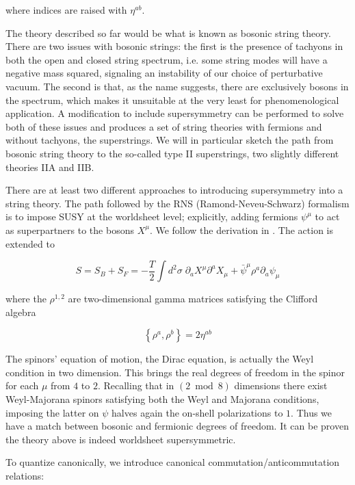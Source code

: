 where indices are raised with $\eta^{ab}$.

The theory described so far would be what is known as bosonic string theory. There are two issues with bosonic strings: the first is the presence of tachyons in both the open and closed string spectrum, i.e. some string modes will have a negative mass squared, signaling an instability of our choice of perturbative vacuum. The second is that, as the name suggests, there are exclusively bosons in the spectrum, which makes it unsuitable at the very least for phenomenological application. A modification to include supersymmetry can be performed to solve both of these issues and produces a set of string theories with fermions and without tachyons, the superstrings. We will in particular sketch the path from bosonic string theory to the so-called type II superstrings, two slightly different theories IIA and IIB.

There are at least two different approaches to introducing supersymmetry into a string theory. The path followed by the RNS (Ramond-Neveu-Schwarz) formalism is to impose SUSY at the worldsheet level; explicitly, adding fermions $\psi^\mu$ to act as superpartners to the bosons $X^\mu$. We follow the derivation in \cite{BBS}. The action is extended to

\begin{equation}
S = S_B + S_F = -\frac{T}{2} \int d^2\sigma \; \partial_a X^\mu \partial^a X_\mu + \bar \psi^\mu \rho^a \partial_a \psi_\mu
\end{equation}

where the $\rho^{1,2}$ are two-dimensional gamma matrices satisfying the Clifford algebra

\begin{equation}
	\left\{ \rho^a,\rho^b \right\} = 2\eta^{ab}
	\label{}
\end{equation}

The spinors' equation of motion, the Dirac equation, is actually the Weyl condition in two dimension. This brings the real degrees of freedom in the spinor for each $\mu$ from $4$ to $2$. Recalling that in $(2\bmod 8)$ dimensions there exist Weyl-Majorana spinors satisfying both the Weyl and Majorana conditions, imposing the latter on $\psi$ halves again the on-shell polarizations to $1$. Thus we have a match between bosonic and fermionic degrees of freedom. It can be proven the theory above is indeed worldsheet supersymmetric.

To quantize canonically, we introduce canonical commutation/anticom\-mu\-ta\-tion relations:

